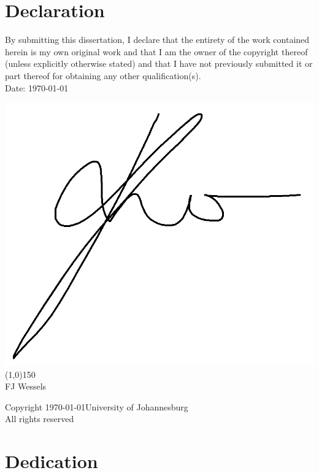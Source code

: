 \documentclass[12pt, oneside]{book}
\begin{document}
\tableofcontents





\chapter*{Declaration}
%


By submitting this dissertation, I declare that the entirety of the work contained herein is my own original work and that I am the owner of the copyright thereof (unless explicitly otherwise stated) and that I have not previously submitted it or part thereof for obtaining any other qualification(s).\\[1cm]

\noindent Date: \today \\

\begin{flushleft}
\includegraphics[scale=0.15]{Handtekening.png}\\
\line(1,0){150}\\
FJ Wessels\\[5cm]
\end{flushleft}


\noindent Copyright \textcopyright{} \today \space University of Johannesburg\\
\noindent All rights reserved

\chapter*{Dedication}
%
\end{document}
